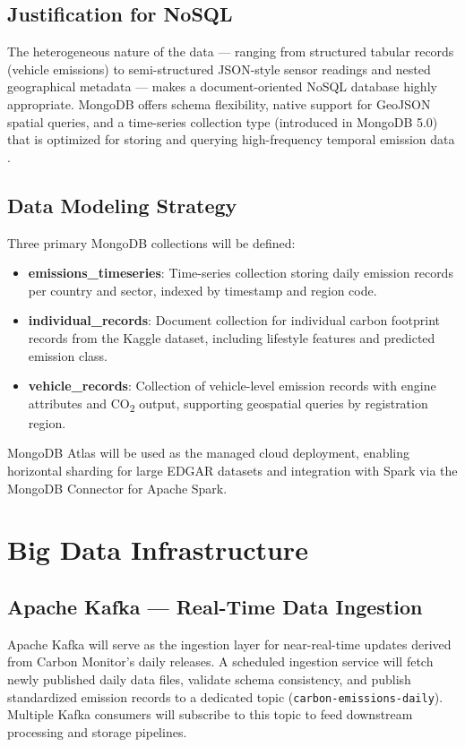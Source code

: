 \documentclass[conference]{IEEEtran}
\begin{document}
\subsection{Justification for NoSQL}
The heterogeneous nature of the data — ranging from structured tabular records (vehicle emissions) to semi-structured JSON-style sensor readings and nested geographical metadata — makes a document-oriented NoSQL database highly appropriate. MongoDB offers schema flexibility, native support for GeoJSON spatial queries, and a time-series collection type (introduced in MongoDB 5.0) that is optimized for storing and querying high-frequency temporal emission data \cite{mongodb_ts}.

\subsection{Data Modeling Strategy}
Three primary MongoDB collections will be defined:
\begin{itemize}
    \item \textbf{emissions\_timeseries}: Time-series collection storing daily emission records per country and sector, indexed by timestamp and region code.
    \item \textbf{individual\_records}: Document collection for individual carbon footprint records from the Kaggle dataset, including lifestyle features and predicted emission class.
    \item \textbf{vehicle\_records}: Collection of vehicle-level emission records with engine attributes and CO\textsubscript{2} output, supporting geospatial queries by registration region.
\end{itemize}

MongoDB Atlas will be used as the managed cloud deployment, enabling horizontal sharding for large EDGAR datasets and integration with Spark via the MongoDB Connector for Apache Spark.

\section{Big Data Infrastructure}

\subsection{Apache Kafka — Real-Time Data Ingestion}
Apache Kafka will serve as the ingestion layer for near-real-time updates derived from Carbon Monitor's daily releases. A scheduled ingestion service will fetch newly published daily data files, validate schema consistency, and publish standardized emission records to a dedicated topic (\texttt{carbon-emissions-daily}). Multiple Kafka consumers will subscribe to this topic to feed downstream processing and storage pipelines.
\end{document}
